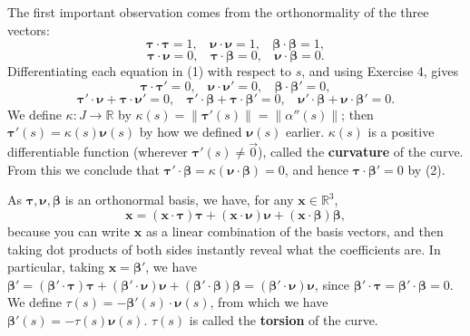 \documentclass[leqno]{book}
\begin{document}
The first important observation comes from the orthonormality of the three vectors:
\begin{equation}\tag{1}\boldsymbol\tau\cdot\boldsymbol\tau=1,~~~~\boldsymbol\nu\cdot\boldsymbol\nu=1,~~~~\boldsymbol\beta\cdot\boldsymbol\beta=1,\end{equation}
$$\boldsymbol\tau\cdot\boldsymbol\nu=0,~~~~\boldsymbol\tau\cdot\boldsymbol\beta=0,~~~~\boldsymbol\nu\cdot\boldsymbol\beta=0.$$
Differentiating each equation in (1) with respect to $s$, and using Exercise 4, gives
\begin{equation}\tag{2}\boldsymbol\tau\cdot\boldsymbol\tau'=0,~~~~\boldsymbol\nu\cdot\boldsymbol\nu'=0,~~~~\boldsymbol\beta\cdot\boldsymbol\beta'=0,\end{equation}
$$\boldsymbol\tau'\cdot\boldsymbol\nu+\boldsymbol\tau\cdot\boldsymbol\nu'=0,~~~~\boldsymbol\tau'\cdot\boldsymbol\beta+\boldsymbol\tau\cdot\boldsymbol\beta'=0,~~~~\boldsymbol\nu'\cdot\boldsymbol\beta+\boldsymbol\nu\cdot\boldsymbol\beta'=0.$$
We define $\kappa:J\to\mathbb R$ by $\kappa(s)=\|\boldsymbol\tau'(s)\|=\|\alpha''(s)\|$; then $\boldsymbol\tau'(s)=\kappa(s)\boldsymbol\nu(s)$ by how we defined $\boldsymbol\nu(s)$ earlier.  $\kappa(s)$ is a positive differentiable function (wherever $\boldsymbol\tau'(s)\ne\vec 0$), called the \textbf{curvature} of the curve.  From this we conclude that $\boldsymbol\tau'\cdot\boldsymbol\beta=\kappa(\boldsymbol\nu\cdot\boldsymbol\beta)=0$, and hence $\boldsymbol\tau\cdot\boldsymbol\beta'=0$ by (2).

As $\boldsymbol\tau,\boldsymbol\nu,\boldsymbol\beta$ is an orthonormal basis, we have, for any $\mathbf x\in\mathbb R^3$,
\begin{equation}\tag{3}\mathbf x=(\mathbf x\cdot\boldsymbol\tau)\boldsymbol\tau+(\mathbf x\cdot\boldsymbol\nu)\boldsymbol\nu+(\mathbf x\cdot\boldsymbol\beta)\boldsymbol\beta,\end{equation} %
because you can write $\mathbf x$ as a linear combination of the basis vectors, and then taking dot products of both sides instantly reveal what the coefficients are.  In particular, taking $\mathbf x=\boldsymbol\beta'$, we have $\boldsymbol\beta'=(\boldsymbol\beta'\cdot\boldsymbol\tau)\boldsymbol\tau+(\boldsymbol\beta'\cdot\boldsymbol\nu)\boldsymbol\nu+(\boldsymbol\beta'\cdot\boldsymbol\beta)\boldsymbol\beta=(\boldsymbol\beta'\cdot\boldsymbol\nu)\boldsymbol\nu$, since $\boldsymbol\beta'\cdot\boldsymbol\tau=\boldsymbol\beta'\cdot\boldsymbol\beta=0$.  We define $\tau(s)=-\boldsymbol\beta'(s)\cdot\boldsymbol\nu(s)$, from which we have $\boldsymbol\beta'(s)=-\tau(s)\boldsymbol\nu(s)$.  $\tau(s)$ is called the \textbf{torsion} of the curve.
\end{document}
